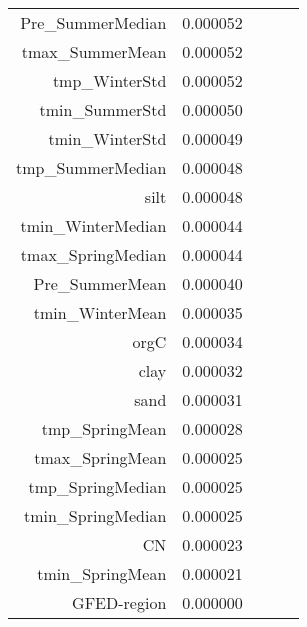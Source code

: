 \begin{tabular}{rrrrr}
Pre_SummerMedian & 0.000052 \\
tmax_SummerMean & 0.000052 \\
tmp_WinterStd & 0.000052 \\
tmin_SummerStd & 0.000050 \\
tmin_WinterStd & 0.000049 \\
tmp_SummerMedian & 0.000048 \\
silt & 0.000048 \\
tmin_WinterMedian & 0.000044 \\
tmax_SpringMedian & 0.000044 \\
Pre_SummerMean & 0.000040 \\
tmin_WinterMean & 0.000035 \\
orgC & 0.000034 \\
clay & 0.000032 \\
sand & 0.000031 \\
tmp_SpringMean & 0.000028 \\
tmax_SpringMean & 0.000025 \\
tmp_SpringMedian & 0.000025 \\
tmin_SpringMedian & 0.000025 \\
CN & 0.000023 \\
tmin_SpringMean & 0.000021 \\
GFED-region & 0.000000 \\
\bottomrule
\end{tabular}
